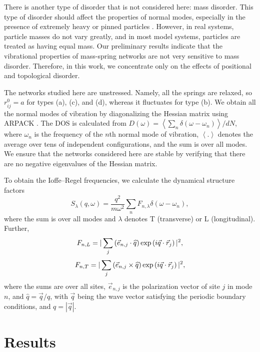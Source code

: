\documentclass[twocolumn,printnumbers,amsmath,amssymb,prl,verbatim]{revtex4}
\begin{document}
There is another type of disorder that is not considered here: mass disorder. This type of disorder should affect the properties of normal modes, especially in the presence of extremely heavy or pinned particles \cite{tong_pre}. However, in real systems, particle masses do not vary greatly, and in most model systems, particles are treated as having equal mass. Our preliminary results indicate that the vibrational properties of mass-spring networks are not very sensitive to mass disorder. Therefore, in this work, we concentrate only on the effects of positional and topological disorder.

The networks studied here are unstressed. Namely, all the springs are relaxed, so $r_{ij}^0=a$ for types (a), (c), and (d), whereas it fluctuates for type (b). We obtain all the normal modes of vibration by diagonalizing the Hessian matrix using ARPACK \cite{arpack}. The DOS is calculated from $D(\omega)=\left< \sum_n \delta(\omega - \omega_n)\right> / dN$, where $\omega_n$ is the frequency of the $n$th normal mode of vibration, $\left< .\right>$ denotes the average over tens of independent configurations, and the sum is over all modes. We ensure that the networks considered here are stable by verifying that there are no negative eigenvalues of the Hessian matrix.

To obtain the Ioffe--Regel frequencies, we calculate the dynamical structure factors \cite{shintani,xipeng}
\begin{equation}
	S_{\lambda}(q,\omega)=\frac{q^2}{m\omega^2}\sum_{n}F_{n,\lambda}\delta\left({\omega-\omega_{n}}\right), \label{s1}
\end{equation}
where the sum is over all modes and $\lambda$ denotes T (transverse) or L (longitudinal). Further,
\begin{equation}
	F_{n,L}=|\sum_{j}\left(\vec{e}_{n,j}\cdot\widehat{q}\right){\rm exp}\left(i\vec{q}\cdot\vec{r}_{j}\right)|^2,\label{fl}
\end{equation}
\begin{equation}
	F_{n,T}=|\sum_{j}\left(\vec{e}_{n,j}\times\widehat{q}\right){\rm exp}\left(i\vec{q}\cdot\vec{r}_{j}\right)|^2,\label{ft}
\end{equation}
where the sums are over all sites, $\vec{e}_{n,j}$ is the polarization vector of site $j$ in mode $n$, and $\widehat{q}=\vec{q}/q$, with $\vec{q}$ being the wave vector satisfying the periodic boundary conditions, and $q=|\vec{q}|$.

\section{Results}
\label{sec:results}
\end{document}
